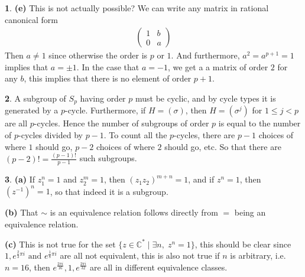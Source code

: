 \documentclass[10.5pt]{article}
\theoremstyle{definition}
\newtheorem{pb}{}
\newcommand{\set}[1]{\{#1\}}
\newcommand{\tand}{\text{ and }}
\begin{document}
\begin{pb}
        \textbf{(e)} This is not actually possible? We can write any matrix in rational canonical form
        \begin{align*}
            \begin{pmatrix}
                1 & b \\ 0 & a
            \end{pmatrix}
        \end{align*}
        Then \(a \neq 1\) since otherwise the order is \(p\) or \(1\). And furthermore, \(a^2 = a^{p+1} = 1\) implies that \(a = \pm 1\). In the case that \(a = -1\), we get a a matrix of order \(2\) for any \(b\), this implies that there is no element of order \(p+1\).
    \end{pb}
    \begin{pb}
        A subgroup of \(S_p\) having order \(p\) must be cyclic, and by cycle types it is generated by a \(p\)-cycle. Furthermore, if \(H = (\sigma)\), then \(H = (\sigma^j)\) for \(1 \leq j < p\) are all \(p\)-cycles. Hence the number of subgroups of order \(p\) is equal to the number of \(p\)-cycles divided by \(p-1\). To count all the \(p\)-cycles, there are \(p-1\) choices of where \(1\) should go, \(p-2\) choices of where \(2\) should go, etc. So that there are \((p-2)! = \frac{(p-1)!}{p-1}\) such subgroups.
    \end{pb}
    \begin{pb}
        \textbf{(a)} If \(z_1^n = 1\) and \(z_2^m = 1\), then \((z_1z_2)^{m+n} = 1\), and if \(z^n = 1\), then \((z^{-1})^n = 1\), so that indeed it is a subgroup.

        \textbf{(b)} That \(\sim\) is an equivalence relation follows directly from \(=\) being an equivalence relation.

        \textbf{(c)} This is not true for the set \(\set{z \in \mathbb{C}^* \mid \exists n, \;z^n = 1}\), this should be clear since \(1, e^{\frac23 \pi i} \tand e^{\frac18 \pi i}\) are all not equivalent, this is also not true if \(n\) is arbitrary, i.e. \(n=16\), then \(e^{\frac{2\pi i}{16}},1,e^{\frac{2\pi i}{32}}\) are all in different equivalence classes.
    \end{pb}
\end{document}
